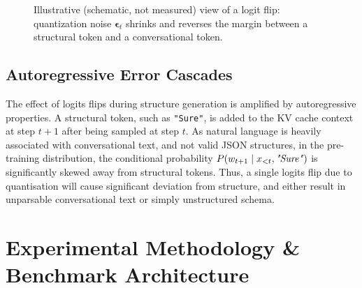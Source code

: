 \documentclass[10pt,journal,compsoc]{IEEEtran}
\begin{document}
\begin{figure}[!t]
\centering
{}
\caption{Illustrative (schematic, not measured) view of a logit flip: quantization noise $\boldsymbol{\epsilon}_t$ shrinks and reverses the margin between a structural token and a conversational token.}
\label{fig:logit_flip}
\end{figure}

\subsection{Autoregressive Error Cascades}
The effect of logits flips during structure generation is amplified by autoregressive properties. A structural token, such as \texttt{"Sure"}, is added to the KV cache context at step $t+1$ after being sampled at step $t$. As natural language is heavily associated with conversational text, and not valid JSON structures, in the pre-training distribution, the conditional probability $P(w_{t+1} \mid x_{<t}, \text{\emph{"Sure"}})$ is significantly skewed away from structural tokens. Thus, a single logits flip due to quantisation will cause significant deviation from structure, and either result in unparsable conversational text or simply unstructured schema.

\section{Experimental Methodology \& Benchmark Architecture}
\end{document}
